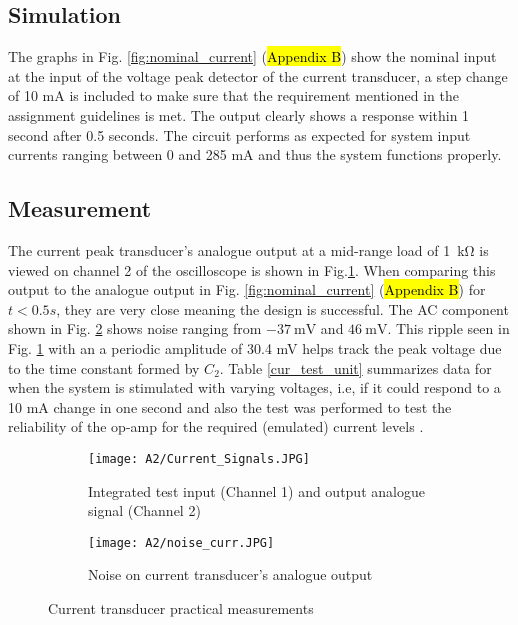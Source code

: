  \subsection{Simulation} \label{sec:itrans_simu}
 
The graphs in Fig. \ref{fig:nominal_current} (\hl{Appendix B}) show the nominal input at the input of the voltage peak detector of the current transducer, a step change of 10 mA is included to make sure that the requirement mentioned in the assignment guidelines \cite{assignment_2} is met. The output clearly shows a response within 1 second after 0.5 seconds. The circuit performs as expected for system input currents ranging between 0 and 285 \si{\milli\ampere} and thus the system functions properly.



\subsection{Measurement} \label{sec:itrans_meas}

The current peak transducer's analogue output at a mid-range load of \SI{1}{\kilo\ohm} is viewed on channel 2 of the oscilloscope is shown in Fig.\ref{subfig:current_sig}. When comparing this output to the analogue output in Fig. \ref{fig:nominal_current} (\hl{Appendix B}) for $t<0.5s$, they are very close meaning the design is successful. The AC component shown in Fig. \ref{subfig:current_noise} shows noise ranging from $\SI{-37}{\milli \volt}$ and $\SI{46}{\milli \volt}$. This ripple seen in Fig. \ref{subfig:current_sig} with an a periodic amplitude of 30.4 mV helps track the peak voltage due to the time constant formed by $C_2$. Table \ref{cur_test_unit} summarizes data for when the system is stimulated with varying voltages, i.e, if it could respond to a 10 mA change in one second and also the test was performed to test the reliability of the op-amp for the required (emulated) current levels \cite{assignment_2}.


 \begin{figure}[H]
\centering
\begin{subfigure}{.5\textwidth}
  \centering
  \texttt{[image: A2/Current\_Signals.JPG]}
    \caption{Integrated test input (Channel 1) and output analogue signal (Channel 2)}
    \label{subfig:current_sig}
\end{subfigure}%
\begin{subfigure}{.5\textwidth}
  \centering
  \texttt{[image: A2/noise\_curr.JPG]}
   \caption{Noise on current transducer's analogue output}
    \label{subfig:current_noise}
\end{subfigure}
\label{current_practical}
\caption{Current transducer practical measurements}
\end{figure}

